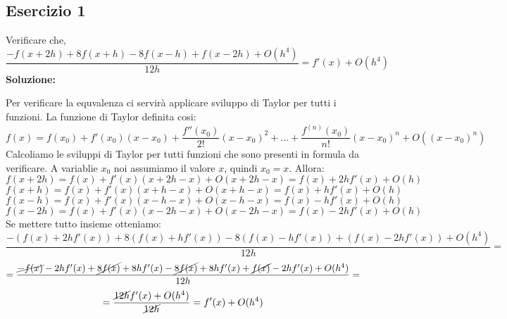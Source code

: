 \subsection{Esercizio 1}
\newcommand\esOneFormula[4]
{\frac{-#1 + 8#2 - 8#3 + #4 + O(h^4)}{12h}}
Verificare che,
\[
    \esOneFormula{f(x+2h)}{f(x+h)}{f(x-h)}{f(x-2h)} = f'(x)+ O(h^4)
\]
\newline \textbf{Soluzione:}

Per verificare la equvalenza ci servirà applicare sviluppo di Taylor per tutti i funzioni.
La funzione di Taylor definita cosi:
\[
    f(x) = f(x_0) + f'(x_0)(x-x_0) + \frac{f''(x_0)}{2!}(x-x_0)^2 + ... + \frac{f^{(n)}(x_0)}{n!}(x-x_0)^n + O((x-x_0)^n)
\]
\newcommand\esOneTaylorTwoSteps[2]
{f(#2) + f'(#2)(#1-#2) + O(#1-#2)}
Calcoliamo le sviluppi di Taylor per tutti funzioni che sono presenti in formula da verificare.
A variablie $x_0$ noi assumiamo il valore $x$, quindi $x_0=x$. Allora:
\[
    f(x+2h) = \esOneTaylorTwoSteps{x+2h}{x} = f(x) + 2hf'(x) + O(h)
\]
\[
    f(x+h) = \esOneTaylorTwoSteps{x+h}{x} = f(x) + hf'(x) + O(h)
\]
\[
    f(x-h) = \esOneTaylorTwoSteps{x-h}{x} = f(x) - hf'(x) + O(h)
\]
\[
    f(x-2h) = \esOneTaylorTwoSteps{x-2h}{x} = f(x) - 2hf'(x) + O(h)
\]
Se mettere tutto insieme otteniamo:
\[
    \esOneFormula{(f(x) + 2hf'(x))}{(f(x) + hf'(x))}{(f(x) - hf'(x))}{(f(x) - 2hf'(x))} =
\]
\[
    = \frac{
        \cancel{-f(x)} - 2hf'(x) 
        + \cancel{8f(x)} + 8hf'(x) 
        - \cancel{8f(x)} + 8hf'(x) 
        + \cancel{f(x)} - 2hf'(x) 
        + O(h^4)}
    {12h} =
\]
\[
    = \frac{\cancel{12h}f'(x) + O(h^4)}{\cancel{12h}} = f'(x) + O(h^4)
\]
